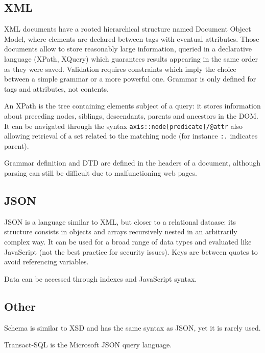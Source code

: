 \subsection{XML}
XML documents have a rooted hierarchical structure named Document Object Model, where elements are declared between tags with eventual attributes. Those documents allow to store reasonably large information, queried in a declarative language (XPath, XQuery) which guarantees results appearing in the same order as they were saved. Validation requires constraints which imply the choice between a simple grammar or a more powerful one. Grammar is only defined for tags and attributes, not contents. 

An XPath is the tree containing elements subject of a query: it stores information about preceding nodes, siblings, descendants, parents and ancestors in the DOM. It can be navigated through the syntax \texttt{axis::node[predicate]/@attr} also allowing retrieval of a set related to the matching node (for instance \texttt{:.} indicates parent). 

Grammar definition and DTD are defined in the headers of a document, although parsing can still be difficult due to malfunctioning web pages. 

\subsection{JSON}
JSON is a language similar to XML, but closer to a relational dataase: its structure consists in objects and arrays recursively nested in an arbitrarily complex way. It can be used for a broad range of data types and evaluated like JavaScript (not the best practice for security issues). Keys are between quotes to avoid referencing variables. 

Data can be accessed through indexes and JavaScript syntax.

\subsection{Other}
Schema is similar to XSD and has the same syntax as JSON, yet it is rarely used.

Transact-SQL is the Microsoft JSON query language.

